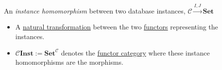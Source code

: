 An \emph{instance homomorphism} between two database instances, $\mathcal{C}\xrightarrow{I,J}\mathbf{Set}$

\begin{itemize}
    \item  A \href{doc/1 math/Seven Sketches in Compositionality/Chapter 3: Databases/3 Functors, natural transformations, and databases/4 Natural transformations/1 Natural transformation}{natural transformation} between the two \href{doc/1 math/Seven Sketches in Compositionality/Chapter 3: Databases/3 Functors, natural transformations, and databases/2 Functors/1 Functor}{functors} representing the instances.
    \item $\mathcal{C}\mathbf{Inst}:=\mathbf{Set}^\mathcal{C}$ denotes the \href{doc/1 math/Seven Sketches in Compositionality/Chapter 3: Databases/3 Functors, natural transformations, and databases/4 Natural transformations/3 Functor category}{functor category} where these instance homomorphisms are the morphisms.

  \end{itemize}
